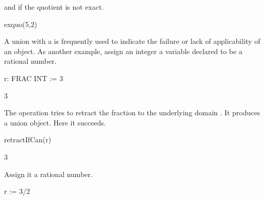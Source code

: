 \begin{xtc}
\begin{xtccomment}
and  if the quotient is not exact.
\end{xtccomment}
\begin{spadsrc}
exquo(5,2)
\end{spadsrc}
\begin{TeXOutput}
\begin{fricasmath}{9}
%
\end{fricasmath}
\end{TeXOutput}
\end{xtc}
\begin{xtc}
\begin{xtccomment}
A union with a  is frequently used to indicate the failure
or lack of applicability of an object.
As another example, assign an integer a variable  declared to be a
rational number.
\end{xtccomment}
\begin{spadsrc}
r: FRAC INT := 3 
\end{spadsrc}
\begin{TeXOutput}
\begin{fricasmath}{10}
3%
\end{fricasmath}
\end{TeXOutput}
\end{xtc}
\begin{xtc}
\begin{xtccomment}
The operation  tries to retract the
fraction to the underlying domain .
It produces a union object.
Here it succeeds.
\end{xtccomment}
\begin{spadsrc}
retractIfCan(r) 
\end{spadsrc}
\begin{TeXOutput}
\begin{fricasmath}{11}
3%
\end{fricasmath}
\end{TeXOutput}
\end{xtc}
\begin{xtc}
\begin{xtccomment}
Assign it a rational number.
\end{xtccomment}
\begin{spadsrc}
r := 3/2 
\end{spadsrc}
\begin{TeXOutput}
\begin{fricasmath}{12}
%
\end{fricasmath}
\end{TeXOutput}
\end{xtc}
